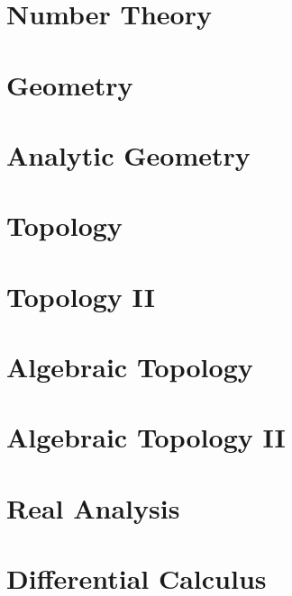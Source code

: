 \documentclass[a4paper]{article}
\begin{document}
\section{Number Theory}

\section{Geometry}

\section{Analytic Geometry}

\section{Topology}

\section{Topology II}

\section{Algebraic Topology}

\section{Algebraic Topology II}

\section{Real Analysis}

\section{Differential Calculus}
\end{document}
